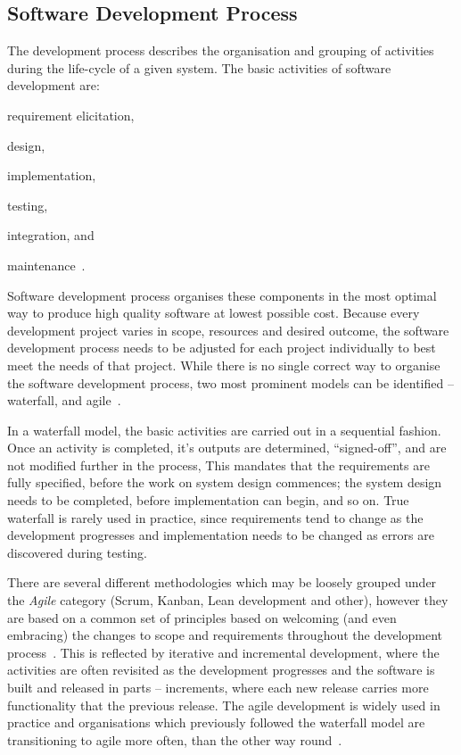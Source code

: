 \subsection{Software Development Process}

The development process describes the organisation and grouping of activities during the life-cycle of a given system. The basic activities of software development are:
% 
\begin{enumerate*}[label=(\roman*)]
    \item requirement elicitation,
    \item design,
    \item implementation,
    \item testing,
    \item integration, and
    \item maintenance~\cite{Sommerville2011SoftwareEngineering, CMS2005SELECTINGAPPROACH}.
\end{enumerate*}
% 
Software development process organises these components in the most optimal way to produce high quality software at lowest possible cost. Because every development project varies in scope, resources and desired outcome, the software development process needs to be adjusted for each project individually to best meet the needs of that project. While there is no single correct way to organise the software development process, two most prominent models can be identified -- waterfall, and agile~\cite{Sommerville2011SoftwareEngineering}.

In a waterfall model, the basic activities are carried out in a sequential fashion. Once an activity is completed, it's outputs are determined, ``signed-off'', and are not modified further in the process, This mandates that the requirements are fully specified, before the work on system design commences; the system design needs to be completed, before implementation can begin, and so on. True waterfall is rarely used in practice, since requirements tend to change as the development progresses and implementation needs to be changed as errors are discovered during testing.

There are several different methodologies which may be loosely grouped under the \textit{Agile} category (Scrum, Kanban, Lean development and other), however they are based on a common set of principles based on welcoming (and even embracing) the changes to scope and requirements throughout the development process~\cite{KentBeck2001ManifestoDevelopment}. This is reflected by iterative and incremental development, where the activities are often revisited as the development progresses and the software is built and released in parts -- increments, where each new release carries more functionality that the previous release. The agile development is widely used in practice and organisations which previously followed the waterfall model are transitioning to agile more often, than the other way round~\cite{Sommerville2011SoftwareEngineering}.

